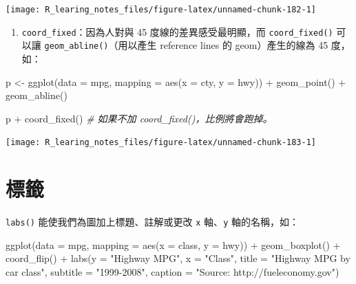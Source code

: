 \documentclass[
]{book}
\newenvironment{Shaded}{\begin{snugshade}}{\end{snugshade}}
\newcommand{\AttributeTok}[1]{\textcolor[rgb]{0.77,0.63,0.00}{#1}}
\newcommand{\CommentTok}[1]{\textcolor[rgb]{0.56,0.35,0.01}{\textit{#1}}}
\newcommand{\FunctionTok}[1]{\textcolor[rgb]{0.00,0.00,0.00}{#1}}
\newcommand{\NormalTok}[1]{#1}
\newcommand{\OtherTok}[1]{\textcolor[rgb]{0.56,0.35,0.01}{#1}}
\newcommand{\SpecialCharTok}[1]{\textcolor[rgb]{0.00,0.00,0.00}{#1}}
\newcommand{\StringTok}[1]{\textcolor[rgb]{0.31,0.60,0.02}{#1}}
\providecommand{\tightlist}{%
  \setlength{\itemsep}{0pt}\setlength{\parskip}{0pt}}
\theoremstyle{definition}
\theoremstyle{remark}
\begin{document}
\begin{center}\texttt{[image: R\_learing\_notes\_files/figure-latex/unnamed-chunk-182-1]} \end{center}

\begin{enumerate}
\def\labelenumi{\arabic{enumi}.}
\setcounter{enumi}{3}
\tightlist
\item
  \texttt{coord\_fixed}：因為人對與 45 度線的差異感受最明顯，而 \texttt{coord\_fixed()} 可以讓 \texttt{geom\_abline()}（用以產生 reference lines 的 geom）產生的線為 45 度，如：
\end{enumerate}

\begin{Shaded}
\begin{Highlighting}[]
\NormalTok{p }\OtherTok{\textless{}{-}} \FunctionTok{ggplot}\NormalTok{(}\AttributeTok{data =}\NormalTok{ mpg, }\AttributeTok{mapping =} \FunctionTok{aes}\NormalTok{(}\AttributeTok{x =}\NormalTok{ cty, }\AttributeTok{y =}\NormalTok{ hwy)) }\SpecialCharTok{+}
  \FunctionTok{geom\_point}\NormalTok{() }\SpecialCharTok{+} \FunctionTok{geom\_abline}\NormalTok{()}

\NormalTok{p }\SpecialCharTok{+} \FunctionTok{coord\_fixed}\NormalTok{()  }\CommentTok{\# 如果不加 coord\_fixed()，比例將會跑掉。}
\end{Highlighting}
\end{Shaded}

\begin{center}\texttt{[image: R\_learing\_notes\_files/figure-latex/unnamed-chunk-183-1]} \end{center}

\hypertarget{ux6a19ux7c64-1}{%
\section{標籤}\label{ux6a19ux7c64-1}}

\texttt{labs()} 能使我們為圖加上標題、註解或更改 \texttt{x} 軸、\texttt{y} 軸的名稱，如：

\begin{Shaded}
\begin{Highlighting}[]
\FunctionTok{ggplot}\NormalTok{(}\AttributeTok{data =}\NormalTok{ mpg, }\AttributeTok{mapping =} \FunctionTok{aes}\NormalTok{(}\AttributeTok{x =}\NormalTok{ class, }\AttributeTok{y =}\NormalTok{ hwy)) }\SpecialCharTok{+} 
  \FunctionTok{geom\_boxplot}\NormalTok{() }\SpecialCharTok{+} 
  \FunctionTok{coord\_flip}\NormalTok{() }\SpecialCharTok{+}
  \FunctionTok{labs}\NormalTok{(}\AttributeTok{y =} \StringTok{"Highway MPG"}\NormalTok{,}
       \AttributeTok{x =} \StringTok{"Class"}\NormalTok{,}
       \AttributeTok{title =} \StringTok{"Highway MPG by car class"}\NormalTok{,}
       \AttributeTok{subtitle =} \StringTok{"1999{-}2008"}\NormalTok{,}
       \AttributeTok{caption =} \StringTok{"Source: http://fueleconomy.gov"}\NormalTok{)}
\end{Highlighting}
\end{Shaded}
\end{document}
